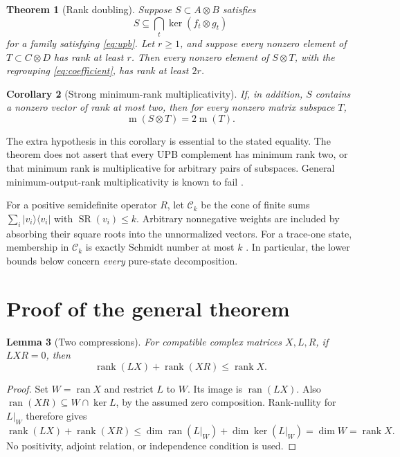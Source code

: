 \documentclass[11pt]{article}
\newtheorem{theorem}{Theorem}[section]
\newtheorem{lemma}[theorem]{Lemma}
\newtheorem{corollary}[theorem]{Corollary}
\theoremstyle{definition}
\newcommand{\rank}{\operatorname{rank}}
\newcommand{\SR}{\operatorname{SR}}
\newcommand{\ran}{\operatorname{ran}}
\newcommand{\minrank}{\operatorname{m}}
\newcommand{\ket}[1]{\lvert #1\rangle}
\newcommand{\bra}[1]{\langle #1\rvert}
\newcommand{\pure}[1]{\ket{#1}\!\bra{#1}}
\begin{document}
\begin{theorem}[Rank doubling]\label{thm:doubling}
Suppose $S\subset A\otimes B$ satisfies
\[
 S\subseteq\bigcap_t\ker(f_t\otimes g_t)
\]
for a family satisfying \eqref{eq:upb}. Let $r\ge1$, and suppose every nonzero
element of $T\subset C\otimes D$ has rank at least $r$. Then every nonzero
element of $S\otimes T$, with the regrouping \eqref{eq:coefficient}, has rank
at least $2r$.
\end{theorem}

\begin{corollary}[Strong minimum-rank multiplicativity]\label{cor:strong}
If, in addition, $S$ contains a nonzero vector of rank at most two, then for
every nonzero matrix subspace $T$,
\begin{equation}\label{eq:strong}
 \minrank(S\otimes T)=2\minrank(T).
\end{equation}
\end{corollary}

The extra hypothesis in this corollary is essential to the stated equality.
The theorem does not assert that every UPB complement has minimum rank two,
or that minimum rank is multiplicative for arbitrary pairs of subspaces.
General minimum-output-rank multiplicativity is known to fail
\cite{cubitt2008}.

For a positive semidefinite operator $R$, let $\mathcal C_k$ be the cone of
finite sums $\sum_i\pure{v_i}$ with $\SR(v_i)\le k$. Arbitrary nonnegative
weights are included by absorbing their square roots into the unnormalized
vectors. For a trace-one state, membership in $\mathcal C_k$ is exactly
Schmidt number at most $k$ \cite{terhal2000}. In particular, the lower bounds
below concern \emph{every} pure-state decomposition.

\section{Proof of the general theorem}

\begin{lemma}[Two compressions]\label{lem:compression}
For compatible complex matrices $X,L,R$, if $LXR=0$, then
\begin{equation}\label{eq:compression}
 \rank(LX)+\rank(XR)\le\rank X.
\end{equation}
\end{lemma}

\begin{proof}
Set $W=\ran X$ and restrict $L$ to $W$. Its image is $\ran(LX)$. Also
$\ran(XR)\subseteq W\cap\ker L$, by the assumed zero composition.
Rank-nullity for $L|_W$ therefore gives
\[
 \rank(LX)+\rank(XR)
 \le \dim\ran(L|_W)+\dim\ker(L|_W)
 =\dim W=\rank X.
\]
No positivity, adjoint relation, or independence condition is used.
\end{proof}
\end{document}
